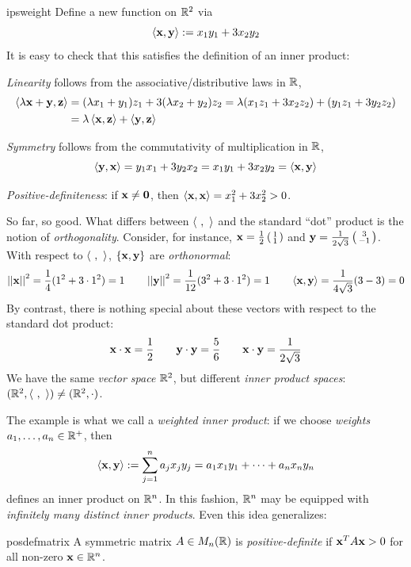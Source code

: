\begin{example}{}{ipsweight}
	Define a new function on $\mathbb{R}^2$ via
	\[
		\left\langle {\mathbf{x}},{\mathbf{y}}\right\rangle:=x_1y_1+3x_2y_2
	\]
	It is easy to check that this satisfies the definition of an inner product: 
	\begin{enumeratea}
  	\item \emph{Linearity} follows from the associative/distributive laws in $\mathbb{R}$,
  	\begin{align*}
  		\left\langle \lambda{\mathbf{x}}+{\mathbf{y}},{\mathbf{z}}\right\rangle
  		&=(\lambda x_1+y_1)z_1+3(\lambda x_2+y_2)z_2
  			=\lambda(x_1z_1+3x_2z_2)+(y_1z_1+3y_2z_2)\\
  		&=\lambda\left\langle {\mathbf{x}},{\mathbf{z}}\right\rangle+\left\langle {\mathbf{y}},{\mathbf{z}}\right\rangle
  	\end{align*}
  	\item \emph{Symmetry} follows from the commutativity of multiplication in $\mathbb{R}$,
  	\[
  		\left\langle {\mathbf{y}},{\mathbf{x}}\right\rangle =y_1x_1+3y_2x_2 =x_1y_1+3x_2y_2 =\left\langle {\mathbf{x}},{\mathbf{y}}\right\rangle
  	\]
		\item \emph{Positive-definiteness}: if ${\mathbf{x}}\neq\mathbf{0}$, then $\left\langle {\mathbf{x}},{\mathbf{x}}\right\rangle=x_1^2+3x_2^2>0$.
	\end{enumeratea}
	So far, so good. What differs between $\left\langle \ ,\ \right\rangle$ and the standard ``dot'' product is the notion of \emph{orthogonality}. Consider, for instance, ${\mathbf{x}}=\frac 12\left(\begin{smallmatrix}1\\1\end{smallmatrix}\right)$ and ${\mathbf{y}}=\frac 1{2\sqrt{3}}\left(\begin{smallmatrix}3\\-1\end{smallmatrix}\right)$. With respect to $\left\langle \ ,\ \right\rangle$, $\{{\mathbf{x}},{\mathbf{y}}\}$ are \emph{orthonormal}:
  \[
  	\left| \left| {\mathbf{x}}\right|\right|^2=\frac 14(1^2+3\cdot 1^2)=1\qquad 
  	\left| \left| {\mathbf{y}}\right|\right|^2=\frac 1{12}(3^2+3\cdot 1^2)=1\qquad 
  	\left\langle {\mathbf{x}},{\mathbf{y}}\right\rangle=\frac 1{4\sqrt 3}(3-3)=0
  \]
  	By contrast, there is nothing special about these vectors with respect to the standard dot product:
  \[
  	{\mathbf{x}}\cdot{\mathbf{x}}=\frac 12\qquad 
  	{\mathbf{y}}\cdot{\mathbf{y}}=\frac 56\qquad 
  	{\mathbf{x}}\cdot {\mathbf{y}}=\frac 1{2\sqrt 3}
  \]
  We have the same \emph{vector space} $\mathbb{R}^2$, but different \emph{inner product spaces}: $(\R^2,\ip{\ ,\ })\neq (\R^2,\cdot)$.
\end{example}

The example is what we call a \emph{weighted inner product}: if we choose \emph{weights} $a_1,\ldots,a_n\in\mathbb{R}^+$, then
\[
	\left\langle {\mathbf{x}},{\mathbf{y}}\right\rangle :=\sum_{j=1}^na_jx_jy_j =a_1x_1y_1+\cdots+a_nx_ny_n
\]
defines an inner product on $\mathbb{R}^n$. In this fashion, $\mathbb{R}^n$ may be equipped with \emph{infinitely many distinct inner products}. Even this idea generalizes:
	
\begin{defn}{}{posdefmatrix}
	A symmetric matrix $A\in M_n(\mathbb{R})$ is \emph{positive-definite} if ${\mathbf{x}}^TA{\mathbf{x}}>0$ for all non-zero ${\mathbf{x}}\in\mathbb{R}^n$.
\end{defn}


